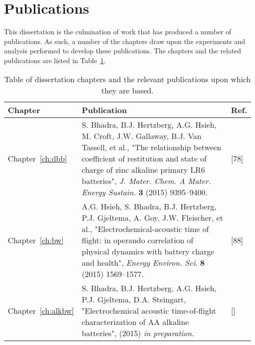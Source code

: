 \section{Publications}
\label{sec:intro:publications}

This dissertation is the culmination of work that has produced a number of publications. As such, a number of the chapters draw upon the experiments and analysis performed to develop  these publications. The chapters and the related publications are listed in Table~\ref{tab:pubtable}.

\begin{table}[htb]
  \caption[List of chapters and associated publications]{\label{tab:pubtable}Table of dissertation chapters and the relevant publications upon which they are based.}
  \begin{tabular}{l p{11 cm} l}
    \hline
    \textbf{Chapter} & \textbf{Publication} & \textbf{Ref.}\\
    \hline
        Chapter~\ref{ch:dbb} & S. Bhadra, B.J. Hertzberg, A.G. Hsieh, M. Croft, J.W. Gallaway, B.J. Van Tassell, et al., "The relationship between coefficient of restitution and state of charge of zinc alkaline primary LR6 batteries", \textit{J. Mater. Chem. A Mater. Energy Sustain.} \textbf{3} (2015) 9395--9400. & [78] \\
        Chapter~\ref{ch:bw} & A.G. Hsieh, S. Bhadra, B.J. Hertzberg, P.J. Gjeltema, A. Goy, J.W. Fleischer, et al., "Electrochemical-acoustic time of flight: in operando correlation of physical dynamics with battery charge and health", \textit{Energy Environ. Sci}. \textbf{8} (2015) 1569--1577. & [88] \\
        Chapter~\ref{ch:alkbw} & S. Bhadra, B.J. Hertzberg, A.G. Hsieh, P.J. Gjeltema, D.A. Steingart, "Electrochemical acoustic time-of-flight characterization of AA alkaline batteries", (2015) \textit{in preparation}. & []\\
  \end{tabular}
 
\end{table}












